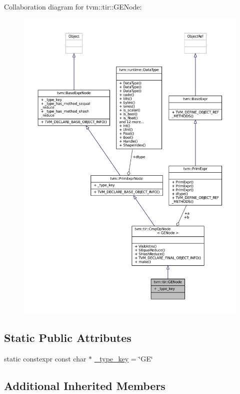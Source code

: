 Collaboration diagram for tvm\+:\+:tir\+:\+:G\+E\+Node\+:
\nopagebreak
\begin{figure}[H]
\begin{center}
\leavevmode
\includegraphics[width=350pt]{classtvm_1_1tir_1_1GENode__coll__graph}
\end{center}
\end{figure}
\subsection*{Static Public Attributes}
\begin{DoxyCompactItemize}
\item 
static constexpr const char $\ast$ \hyperlink{classtvm_1_1tir_1_1GENode_a43472b79fb4e4cc540ecf441d0cdcd1b}{\+\_\+type\+\_\+key} = \char`\"{}GE\char`\"{}
\end{DoxyCompactItemize}
\subsection*{Additional Inherited Members}


